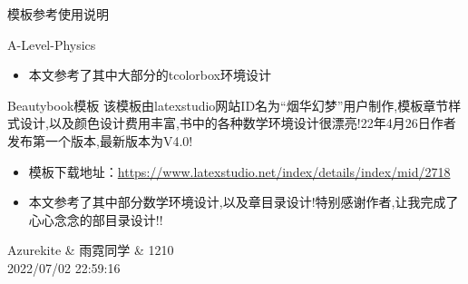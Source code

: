 \begin{ascolorbox5}{模板参考使用说明}
\begin{ascboxB}{A-Level-Physics}
\begin{itemize}
	\item 本文参考了其中大部分的tcolorbox环境设计
\end{itemize} 	
\end{ascboxB}
\begin{ascboxB}{Beautybook模板}
该模板由latexstudio网站ID名为“烟华幻梦”用户制作,模板章节样式设计,以及颜色设计费用丰富,书中的各种数学环境设计很漂亮!22年4月26日作者发布第一个版本,最新版本为V4.0!
    \begin{itemize}
        \item 模板下载地址：\href{https://www.latexstudio.net/index/details/index/mid/2718}{https://www.latexstudio.net/index/details/index/mid/2718}
        \item 本文参考了其中部分数学环境设计,以及章目录设计!特别感谢作者,让我完成了心心念念的部目录设计!!
    \end{itemize} 	
\end{ascboxB}
\end{ascolorbox5}
\begin{flushright}
	Azurekite \& 雨霓同学 \& 1210 \\
	2022/07/02 22:59:16
\end{flushright}


